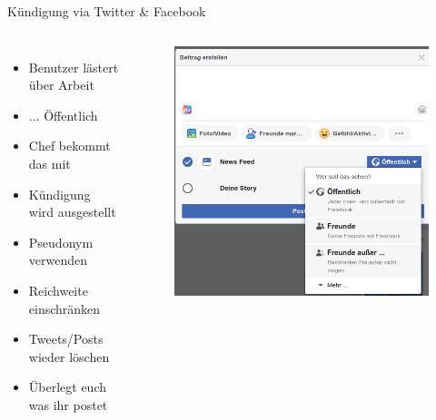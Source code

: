 \documentclass[10pt]{beamer}
\begin{document}
\begin{frame}[fragile]{Kündigung via Twitter \& Facebook}
\begin{columns}[T,c,onlytextwidth]
  \begin{itemize}
    \item Benutzer lästert über Arbeit
    \item ... Öffentlich
    \item Chef bekommt das mit
    \item Kündigung wird ausgestellt
    \item \alert{Pseudonym verwenden}
    \item \alert{Reichweite einschränken}
    \item \alert{Tweets/Posts wieder löschen}
    \item \alert{Überlegt euch was ihr postet}
  \end{itemize}
	\begin{figure}
		\includegraphics[width=1\textwidth]{images/facebook}
	\end{figure}
\end{columns}
\end{frame}
\end{document}
